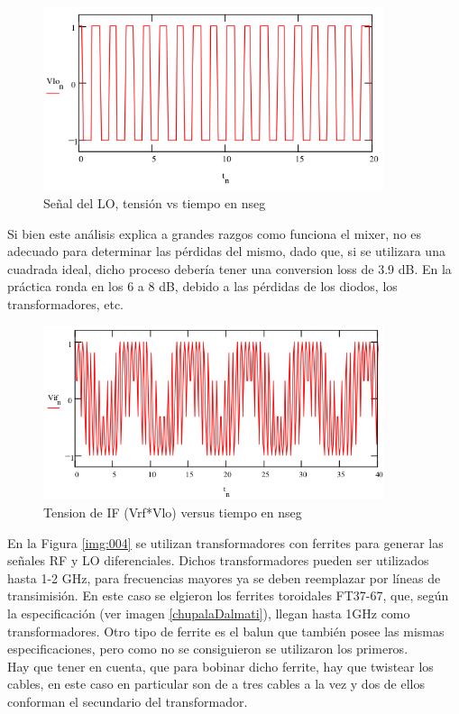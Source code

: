 \documentclass[a4paper,10pt]{article}
\begin{document}
	\begin{figure}[!htb]
		\centering
		\includegraphics[width=10cm]{Images/VLO.png}
		\caption{Señal del LO, tensión vs tiempo en nseg}
		\label{img:006}
	\end{figure}
	
	\indent Si bien este análisis explica a grandes razgos como funciona el 
	mixer, no es adecuado para determinar las pérdidas del mismo, dado que, si 
	se utilizara una cuadrada ideal, dicho proceso debería tener una conversion
	loss de 3.9 dB. En la práctica ronda en los 6 a 8 dB, debido a las pérdidas
	de los diodos, los transformadores, etc. \\
	
	\begin{figure}[!htb]
		\centering
		\includegraphics[width=10cm]{Images/VIF.png}
		\caption{Tension de IF (Vrf*Vlo) versus tiempo en nseg}
		\label{img:007}
	\end{figure}

	\indent En la Figura \ref{img:004} se utilizan transformadores con ferrites 
	para generar las señales RF y LO diferenciales. Dichos transformadores 
	pueden ser utilizados hasta 1-2 GHz, para frecuencias mayores ya se deben 
	reemplazar por líneas de transimisión. En este caso se elgieron los 
	ferrites toroidales FT37-67, que, según la especificación (ver imagen 
	\ref{chupalaDalmati}), llegan hasta 1GHz como transformadores. Otro tipo de 
	ferrite es el balun que tambi\'en posee las mismas especificaciones, pero 
	como no se consiguieron se utilizaron los primeros.\\
	\indent Hay que tener en cuenta, que para bobinar dicho ferrite, hay que 
	twistear los cables, en este caso en particular son de a tres cables a la 
	vez y dos de ellos conforman el secundario del transformador.
\end{document}
